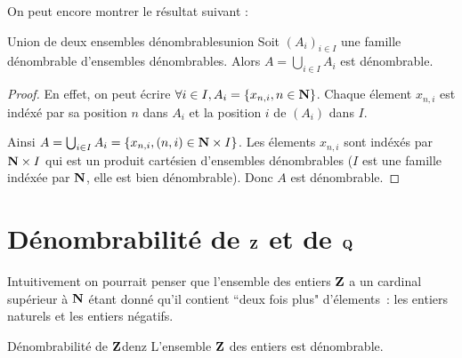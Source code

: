 \documentclass[a4paper,french,final]{memoir}
\begin{document}
On peut encore montrer le résultat suivant : 
\begin{theoremb}{Union de deux ensembles dénombrables}{union}
    Soit $(A_i)_{i \in I}$ une famille dénombrable d'ensembles dénombrables. 
	Alors $A= \bigcup_{i \in I} A_i$ est dénombrable. 
\end{theoremb} 
\begin{proof}
	En effet, on peut écrire $\forall i \in I, A_i = \{x_{n,i}, n \in \mathbf{N}\}$. Chaque élement $x_{n, i}$ est indéxé par sa position $n$ dans $A_i$ et la position $i$ de $(A_i)$ dans $I$. 
	
	Ainsi $A = \bigcup_{i \in I} A_i = \{x_{n, i}, (n,i) \in \mathbf{N} \times I\}$. Les élements $x_{n,i}$ sont indéxés par $\mathbf{N} \times I$ qui est un produit cartésien d'ensembles dénombrables ($I$ est une famille indéxée par $\mathbf{N}$, elle est bien dénombrable). Donc $A$ est dénombrable.
\end{proof}
\section{\texorpdfstring{Dénombrabilité de $\mathbf{Z}$ et de $\mathbf{Q}$}{Dénombrabilité de Z et Q}}

Intuitivement on pourrait penser que l'ensemble des entiers $\mathbf{Z}$ a un cardinal supérieur à $\mathbf{N}$ étant donné qu'il contient ``deux fois plus" d'élements~: les entiers naturels et les entiers négatifs. 

\begin{theoremb}{Dénombrabilité de $\mathbf{Z}$}{denz}
	L'ensemble $\mathbf{Z}$ des entiers est dénombrable. 
\end{theoremb}
\end{document}
